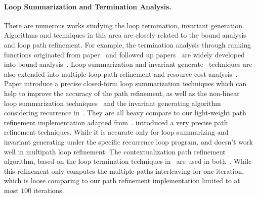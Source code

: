 \paragraph{Loop Summarization and Termination Analysis.}
There are numerous works studying the loop termination, 
invariant generation. Algorithms and techniques in this area are closely related to the bound analysis and loop path refinement.
For example, the termination analysis through ranking functions originated from paper~\cite{BradleyMS05} and followed up papers~\cite{FalkeKS11, FalkeKS12, CookSZ13, Zuleger18} are widely developed into bound analysis~\cite{AliasDFG10, SinnZV14, BrockschmidtEFFG16, BrockschmidtEFFG14}.
Loop summarization and invariant generate~\cite{ManoliosV06, HumenbergerJK18} techniques are also extended into multiple loop path refinement and resource cost analysis~\cite{GulwaniJK09, ZulegerGSV11}. 
Paper \cite{KincaidBCR19} introduce a precise closed-form loop summarization techniques which can help to improve the accuracy of the path refinement, as well as the non-linear loop summarization techniques~\cite{KincaidCBR18} and the invariant generating algorithm considering recurrence in~\cite{BreckCKR20}. They are all heavy compare to our light-weight path refinement implementation adapted from~\cite{GulwaniJK09}.
\cite{CyphertBKR19} introduced a very precise path refinement techniques. While it is accurate only for loop summarizing and invariant generating under the specific recurrence loop program, and doesn't work well in multipath loop refinement.
The contextualization path refinement algorithm, based on the loop termination techniques in~\cite{ManoliosV06} are used in both~\cite{ZulegerGSV11, SinnZV14}. While this refinement only computes the multiple paths interleaving for one iteration, which is loose comparing to our path refinement implementation limited to at most $100$ iterations.
